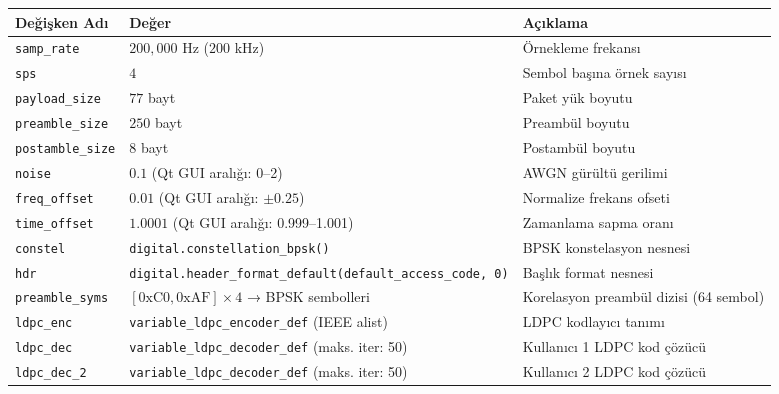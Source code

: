 \documentclass[
]{IEEEtran}
\newcounter{none} %
\begin{document}
{\def\LTcaptype{none} %
\begin{longtable}[]{@{}
  >{\raggedright\arraybackslash}p{}
  >{\raggedright\arraybackslash}p{}
  >{\raggedright\arraybackslash}p{}@{}}
\toprule\noalign{}
\begin{minipage}[b]{\linewidth}\raggedright
Değişken Adı
\end{minipage} & \begin{minipage}[b]{\linewidth}\raggedright
Değer
\end{minipage} & \begin{minipage}[b]{\linewidth}\raggedright
Açıklama
\end{minipage} \\
\midrule\noalign{}
\endhead
\bottomrule\noalign{}
\endlastfoot
\texttt{samp\_rate} & \(200{,}000\) Hz (\(200\) kHz) & Örnekleme
frekansı \\
\texttt{sps} & \(4\) & Sembol başına örnek sayısı \\
\texttt{payload\_size} & \(77\) bayt & Paket yük boyutu \\
\texttt{preamble\_size} & \(250\) bayt & Preambül boyutu \\
\texttt{postamble\_size} & \(8\) bayt & Postambül boyutu \\
\texttt{noise} & \(0.1\) (Qt GUI aralığı: 0--2) & AWGN gürültü
gerilimi \\
\texttt{freq\_offset} & \(0.01\) (Qt GUI aralığı: \(\pm 0.25\)) &
Normalize frekans ofseti \\
\texttt{time\_offset} & \(1.0001\) (Qt GUI aralığı: 0.999--1.001) &
Zamanlama sapma oranı \\
\texttt{constel} & \texttt{digital.constellation\_bpsk()} & BPSK
konstelasyon nesnesi \\
\texttt{hdr} &
\texttt{digital.header\_format\_default(default\_access\_code,\ 0)} &
Başlık format nesnesi \\
\texttt{preamble\_syms} & \([0\text{xC0}, 0\text{xAF}] \times 4\) → BPSK
sembolleri & Korelasyon preambül dizisi (64 sembol) \\
\texttt{ldpc\_enc} & \texttt{variable\_ldpc\_encoder\_def} (IEEE alist)
& LDPC kodlayıcı tanımı \\
\texttt{ldpc\_dec} & \texttt{variable\_ldpc\_decoder\_def} (maks. iter:
50) & Kullanıcı 1 LDPC kod çözücü \\
\texttt{ldpc\_dec\_2} & \texttt{variable\_ldpc\_decoder\_def} (maks.
iter: 50) & Kullanıcı 2 LDPC kod çözücü \\
\end{longtable}
}
\end{document}
